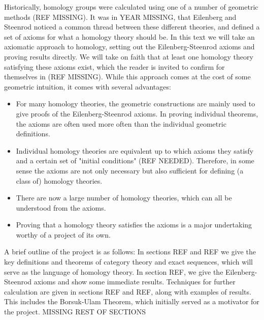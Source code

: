 Historically, homology groups were calculated using one of a number of geometric methods (REF MISSING). It was in YEAR MISSING, that Eilenberg and Steenrod noticed a common thread between these different theories, and defined a set of axioms for what a homology theory should be. In this text we will take an axiomatic approach to homology, setting out the Eilenberg-Steenrod axioms and proving results directly. We will take on faith that at least one homology theory satisfying these axioms exist, which the reader is invited to confirm for themselves in (REF MISSING). While this approach comes at the cost of some geometric intuition, it comes with several advantages:
\begin{itemize}
\item For many homology theories, the geometric constructions are mainly used to give proofs of the Eilenberg-Steenrod axioms. In proving individual theorems, the axioms are often used more often than the individual geometric definitions.
\item Individual homology theories are equivalent up to which axioms they satisfy and a certain set of "initial conditions" (REF NEEDED). Therefore, in some sense the axioms are not only necessary but also sufficient for defining (a class of) homology theories.
\item There are now a large number of homology theories, which can all be understood from the axioms.
\item Proving that a homology theory satisfies the axioms is a major undertaking worthy of a project of its own.
\end{itemize}

A brief outline of the project is as follows: In sections REF and REF we give the key definitions and theorems of category theory and exact sequences, which will serve as the language of homology theory. In section REF, we give the Eilenberg-Steenrod axioms and show some immediate results. Techniques for further calculation are given in sections REF and REF, along with examples of results. This includes the Borsuk-Ulam Theorem, which initially served as a motivator for the project. MISSING REST OF SECTIONS